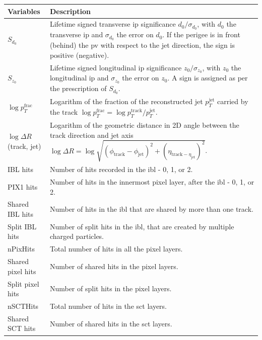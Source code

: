 \begin{table}[h]
  \begin{center}
      \begin{tabular}{C{3cm}|C{13cm}} 
      	 \hline \hline
          Variables & Description  \\ \hline
          $S_{d_0}$      & Lifetime signed transverse \gls{ip} significance $d_0 / \sigma_{d_0}$, with $d_0$ the transverse \gls{ip} and $\sigma_{d_0}$ the error on $d_0$. If the perigee is in front (behind) the \gls{pv} with respect to the jet direction, the sign is positive (negative). \\ \hline
          $S_{z_0}$      & Lifetime signed longitudinal \gls{ip} significance $z_0 / \sigma_{z_0}$, with $z_0$ the longitudinal \gls{ip} and $\sigma_{z_0}$ the error on $z_0$. A sign is assigned as per the prescription of $S_{d_0}$. \\ \hline
          $\log p_T^{\textrm{frac}}$   & Logarithm of the fraction of the reconstructed jet $p_T^{\textrm{jet}}$ carried by the track $\log p_T^{\textrm{frac}} = \log p_T^{\textrm{track}} / p_T^{\textrm{jet}}$. \\ \hline
          $\log \Delta R$(track, jet) & Logarithm of the geometric distance in 2D angle between the track direction and jet axis $\log \Delta R = \log \sqrt{(\phi_{\textrm{track}} - \phi_{\textrm{jet}})^2 + (\eta_{\textrm{track} - \eta_{\textrm{jet}}})^2}$. \\ \hline
          IBL hits      & Number of hits recorded in the \gls{ibl} - 0, 1, or 2. \\ \hline
          PIX1 hits       & Number of hits in the innermost pixel layer, after the \gls{ibl} - 0, 1, or 2.  \\ \hline
          Shared IBL hits & Number of hits in the \gls{ibl} that are shared by more than one track. \\ \hline
          Split IBL hits  & Number of split hits in the \gls{ibl}, that are created by multiple charged particles. \\ \hline
          nPixHits        & Total number of hits in all the pixel layers.\\ \hline
          Shared pixel hits & Number of shared hits in the pixel layers.\\ \hline
          Split pixel hits  & Number of split hits in the pixel layers.\\ \hline
          nSCTHits          & Total number of hits in the \gls{sct} layers. \\ \hline
          Shared SCT hits   & Number of shared hits in the \gls{sct} layers.\\ \hline \hline

\end{tabular}
\end{center}
\end{table}
